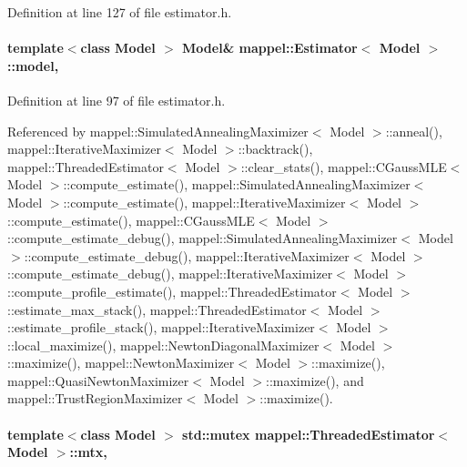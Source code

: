 Definition at line 127 of file estimator.\+h.

\paragraph[{\texorpdfstring{model}{model}}]{\setlength{\rightskip}{0pt plus 5cm}template$<$class Model $>$ Model\& {\bf mappel\+::\+Estimator}$<$ Model $>$\+::model\hspace{0.3cm}{\ttfamily [protected]}, {\ttfamily [inherited]}}\hypertarget{classmappel_1_1Estimator_a8322546d87ccdf01f8b0dcd9dae509f0}{}\label{classmappel_1_1Estimator_a8322546d87ccdf01f8b0dcd9dae509f0}


Definition at line 97 of file estimator.\+h.



Referenced by mappel\+::\+Simulated\+Annealing\+Maximizer$<$ Model $>$\+::anneal(), mappel\+::\+Iterative\+Maximizer$<$ Model $>$\+::backtrack(), mappel\+::\+Threaded\+Estimator$<$ Model $>$\+::clear\+\_\+stats(), mappel\+::\+C\+Gauss\+M\+L\+E$<$ Model $>$\+::compute\+\_\+estimate(), mappel\+::\+Simulated\+Annealing\+Maximizer$<$ Model $>$\+::compute\+\_\+estimate(), mappel\+::\+Iterative\+Maximizer$<$ Model $>$\+::compute\+\_\+estimate(), mappel\+::\+C\+Gauss\+M\+L\+E$<$ Model $>$\+::compute\+\_\+estimate\+\_\+debug(), mappel\+::\+Simulated\+Annealing\+Maximizer$<$ Model $>$\+::compute\+\_\+estimate\+\_\+debug(), mappel\+::\+Iterative\+Maximizer$<$ Model $>$\+::compute\+\_\+estimate\+\_\+debug(), mappel\+::\+Iterative\+Maximizer$<$ Model $>$\+::compute\+\_\+profile\+\_\+estimate(), mappel\+::\+Threaded\+Estimator$<$ Model $>$\+::estimate\+\_\+max\+\_\+stack(), mappel\+::\+Threaded\+Estimator$<$ Model $>$\+::estimate\+\_\+profile\+\_\+stack(), mappel\+::\+Iterative\+Maximizer$<$ Model $>$\+::local\+\_\+maximize(), mappel\+::\+Newton\+Diagonal\+Maximizer$<$ Model $>$\+::maximize(), mappel\+::\+Newton\+Maximizer$<$ Model $>$\+::maximize(), mappel\+::\+Quasi\+Newton\+Maximizer$<$ Model $>$\+::maximize(), and mappel\+::\+Trust\+Region\+Maximizer$<$ Model $>$\+::maximize().

\paragraph[{\texorpdfstring{mtx}{mtx}}]{\setlength{\rightskip}{0pt plus 5cm}template$<$class Model $>$ std\+::mutex {\bf mappel\+::\+Threaded\+Estimator}$<$ Model $>$\+::mtx\hspace{0.3cm}{\ttfamily [protected]}, {\ttfamily [inherited]}}\hypertarget{classmappel_1_1ThreadedEstimator_a4538fd0860243430bfd47e8064c8cfe4}{}\label{classmappel_1_1ThreadedEstimator_a4538fd0860243430bfd47e8064c8cfe4}


